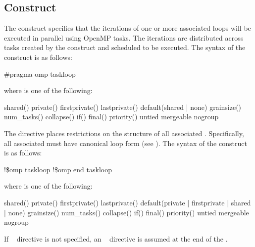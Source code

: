 \subsection{ Construct}
\label{subsec:taskloop Construct}
\summary
The  construct specifies that the iterations of one or more associated loops will be executed in parallel using OpenMP tasks. The iterations are distributed across tasks created by the construct and scheduled to be executed.
\syntax
\ccppspecificstart
The syntax of the  construct is as follows:
\begin{boxedcode}
\#pragma omp taskloop 
\end{boxedcode}
where  is one of the following:
\begin{indentedcodelist}
shared()
private()
firstprivate()
lastprivate()
default(shared \textnormal{|} none)
grainsize()
num_tasks()
collapse()
if()
final()
priority()
untied
mergeable
nogroup
\end{indentedcodelist}

The  directive places restrictions on the structure of all associated . Specifically, all associated  must have canonical loop form (see ).
\ccppspecificend
\fortranspecificstart
The syntax of the  construct is as follows:
\begin{boxedcode}
!\$omp taskloop 
\plc{[}!\$omp end taskloop\plc{]}
\end{boxedcode}
where  is one of the following:
\begin{indentedcodelist}
shared()
private()
firstprivate()
lastprivate()
default(private \textnormal{|} firstprivate \textnormal{|} shared \textnormal{|} none)
grainsize()
num_tasks()
collapse()
if()
final()
priority()
untied
mergeable
nogroup
\end{indentedcodelist}

If ~ directive is not specified, an ~ directive is assumed at the end of the .

